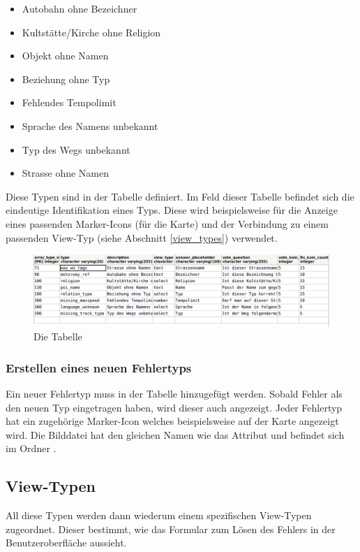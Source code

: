 \begin{itemize}
\item Autobahn ohne Bezeichner
\item Kultstätte/Kirche ohne Religion
\item Objekt ohne Namen
\item Beziehung ohne Typ
\item Fehlendes Tempolimit
\item Sprache des Namens unbekannt
\item Typ des Wegs unbekannt
\item Strasse ohne Namen
\end{itemize}

Diese Typen sind in der Tabelle  definiert.
Im Feld  dieser Tabelle befindet sich die eindeutige Identifikation eines Typs.
Diese wird beispielsweise für die Anzeige eines passenden Marker-Icons (für die Karte) und der Verbindung zu einem passenden View-Typ (siehe Abschnitt \ref{view_types}) verwendet.

\begin{figure}[H]
	\centering
	\includegraphics[width=\textwidth]{images/implementation/backend/table-error-type}
	\caption{Die Tabelle }
\end{figure}

\subsubsection{Erstellen eines neuen Fehlertyps}
\label{create-new-error-type}
Ein neuer Fehlertyp muss in der Tabelle  hinzugefügt werden.
Sobald Fehler als  den neuen Typ eingetragen haben, wird dieser auch angezeigt.
Jeder Fehlertyp hat ein zugehörige Marker-Icon welches beispielsweise auf der Karte angezeigt wird.
Die Bilddatei hat den gleichen Namen wie das Attribut  und befindet sich im Ordner .

\subsection{View-Typen}
\label{view-types}
All diese Typen werden dann wiederum einem spezifischen View-Typen zugeordnet.
Dieser bestimmt, wie das Formular zum Lösen des Fehlers in der Benutzeroberfläche aussieht.


